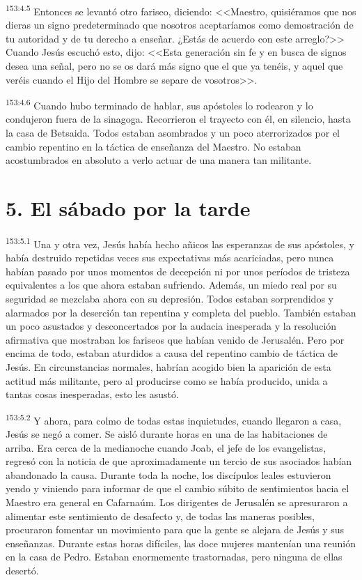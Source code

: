 \par 
\textsuperscript{153:4.5} Entonces se levantó otro fariseo, diciendo: <<Maestro, quisiéramos que nos dieras un signo predeterminado que nosotros aceptaríamos como demostración de tu autoridad y de tu derecho a enseñar. ¿Estás de acuerdo con este arreglo?>> Cuando Jesús escuchó esto, dijo: <<Esta generación sin fe y en busca de signos desea una señal, pero no se os dará más signo que el que ya tenéis, y aquel que veréis cuando el Hijo del Hombre se separe de vosotros>>.

\par 
\textsuperscript{153:4.6} Cuando hubo terminado de hablar, sus apóstoles lo rodearon y lo condujeron fuera de la sinagoga. Recorrieron el trayecto con él, en silencio, hasta la casa de Betsaida. Todos estaban asombrados y un poco aterrorizados por el cambio repentino en la táctica de enseñanza del Maestro. No estaban acostumbrados en absoluto a verlo actuar de una manera tan militante.

\section*{5. El sábado por la tarde}
\par 
\textsuperscript{153:5.1} Una y otra vez, Jesús había hecho añicos las esperanzas de sus apóstoles, y había destruido repetidas veces sus expectativas más acariciadas, pero nunca habían pasado por unos momentos de decepción ni por unos períodos de tristeza equivalentes a los que ahora estaban sufriendo. Además, un miedo real por su seguridad se mezclaba ahora con su depresión. Todos estaban sorprendidos y alarmados por la deserción tan repentina y completa del pueblo. También estaban un poco asustados y desconcertados por la audacia inesperada y la resolución afirmativa que mostraban los fariseos que habían venido de Jerusalén. Pero por encima de todo, estaban aturdidos a causa del repentino cambio de táctica de Jesús. En circunstancias normales, habrían acogido bien la aparición de esta actitud más militante, pero al producirse como se había producido, unida a tantas cosas inesperadas, esto les asustó.

\par 
\textsuperscript{153:5.2} Y ahora, para colmo de todas estas inquietudes, cuando llegaron a casa, Jesús se negó a comer. Se aisló durante horas en una de las habitaciones de arriba. Era cerca de la medianoche cuando Joab, el jefe de los evangelistas, regresó con la noticia de que aproximadamente un tercio de sus asociados habían abandonado la causa. Durante toda la noche, los discípulos leales estuvieron yendo y viniendo para informar de que el cambio súbito de sentimientos hacia el Maestro era general en Cafarnaúm. Los dirigentes de Jerusalén se apresuraron a alimentar este sentimiento de desafecto y, de todas las maneras posibles, procuraron fomentar un movimiento para que la gente se alejara de Jesús y sus enseñanzas. Durante estas horas difíciles, las doce mujeres mantenían una reunión en la casa de Pedro. Estaban enormemente trastornadas, pero ninguna de ellas desertó.

